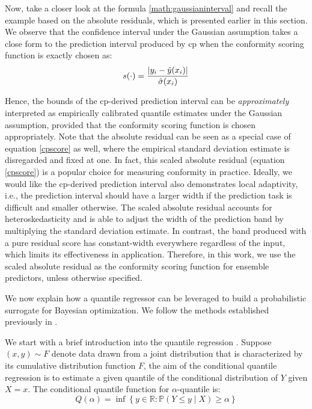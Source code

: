 {\begin{description}[leftmargin=0cm, listparindent=\parindent]
	Now, take a closer look at the formula \ref{math:gaussianinterval} and recall the example based on the absolute residuals, which is presented earlier in this section. We observe that the confidence interval under the Gaussian assumption takes a close form to the prediction interval produced by \gls{cp} when the conformity scoring function is exactly chosen as:
		\vspace{0.7em}
		\begin{equation}
			s(\cdot) = \frac{|y_i - \hat{y}(x_i)|}{\hat\sigma(x_i)}
		\label{cpscore}
		\vspace{0.7em}
		\end{equation}
	
	Hence, the bounds of the \gls{cp}-derived prediction interval can be \textit{approximately} interpreted as empirically calibrated quantile estimates under the Gaussian assumption, provided that the conformity scoring function is chosen appropriately. Note that the absolute residual can be seen as a special case of equation \ref{cpscore} as well, where the empirical standard deviation estimate is disregarded and fixed at one. In fact, this scaled absolute residual (equation \ref{cpscore}) is a popular choice for measuring conformity in practice. Ideally, we would like the \gls{cp}-derived prediction interval also demonstrates local adaptivity, i.e., the prediction interval should have a larger width if the prediction task is difficult and smaller otherwise. The scaled absolute residual accounts for heteroskedasticity and is able to adjust the width of the prediction band by multiplying the standard deviation estimate. In contrast, the band produced with a pure residual score has constant-width everywhere regardless of the input, which limits its effectiveness in application. Therefore, in this work, we use the scaled absolute residual as the conformity scoring function for ensemble predictors, unless otherwise specified.
	\vspace{0.7em}
	\item [Quantile Regressor] We now explain how a quantile regressor can be leveraged to build a probabilistic surrogate for Bayesian optimization. We follow the methods established previously in \cite{romano2019conformalized, salinas2023optimizing}.
	
	
	We start with a brief introduction into the quantile regression \cite{koenker1978regression}. Suppose $(x, y) \sim F$ denote data drawn from a joint distribution that is characterized by its cumulative distribution function $F$, the aim of the conditional quantile regression is to estimate a given quantile of the conditional distribution of $Y$ given $X=x$. The conditional quantile function for $\alpha$-quantile is:
		\begin{equation}
			Q(\alpha) = \inf \left\{ y \in \mathbb{R} : \mathbb{P}(Y \leq y \mid X) \geq \alpha \right\}
		\label{quantilefunc}
		\end{equation}
		

\end{description}}
